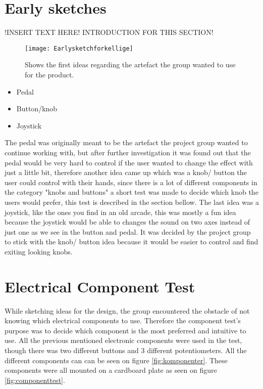 \section{Early sketches}
!INSERT TEXT HERE! INTRODUCTION FOR THIS SECTION!

\begin{figure}[!h] 
\centering
\texttt{[image: Earlysketchforkellige]}
\caption{\label{fig:Earlysketchforkellige} Shows the first ideas regarding the artefact the group wanted to use for the product.}
\end{figure}

\begin{itemize}
\item Pedal
\item Button/knob 
\item Joystick 
\end{itemize}

The pedal was originally meant to be the artefact the project group wanted to continue working with, but after further investigation it was found out that the pedal would be very hard to control if the user wanted to change the effect with just a little bit, therefore another idea came up which was a knob/ button the user could control with their hands, since there is a lot of different components in the category "knobs and buttons" a short test was made to decide which knob the users would prefer, this test is described in the section bellow. The last idea was a joystick, like the ones you find in an old arcade, this was mostly a fun idea because the joystick would be able to changes the sound on two axes instead of just one as we see in the button and pedal. It was decided by the project group to stick with the knob/ button idea because it would be easier to control and find exiting looking knobs. 


\section{Electrical Component Test}
While sketching ideas for the design, the group encountered the obstacle of not knowing which electrical components to use. Therefore the component test's purpose was to decide which component is the most preferred and intuitive to use. All the previous mentioned electronic components were used in the test, though there was two different buttons and 3 different potentiometers. All the different components can can be seen on figure \ref{fig:komponenter}. These components were all mounted on a cardboard plate as seen on figure \ref{fig:componenttest}.


